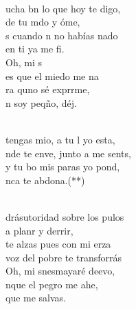 \documentclass[12pt]{article}
\begin{document}
\begin{multicols*}{2}
\begin{cancion}%
	    \\
	ucha bn lo que hoy te digo,\\
	 de tu mdo y óme, \\
	s cuando n no habías nado \\
	 en ti ya me fi. \\
\jump
	Oh, mi s\\
	es que el miedo me na\\
	ra quno sé exprrme,\\
	n soy peqño, déj. \\\jump\\
	\begin{chorus}%
	 tengas mio, a tu l yo esta,\\
	nde te enve, junto a me sents, \\
	y  tu bo mis paras yo pond,\\
	nca te abdona.(**)\\
	\end{chorus}%
	\jump\\
	drásutoridad sobre los pulos\\
	a planr y derrir,\\
	 te alzas pues con mi erza \\
	 voz del pobre te transforrás\\
\jump
	Oh, mi snesmayaré deevo,\\
	nque el pegro me ahe,\\
	 que  me salvas.  \\\jump\\

\end{cancion}
\end{multicols*}
\end{document}

